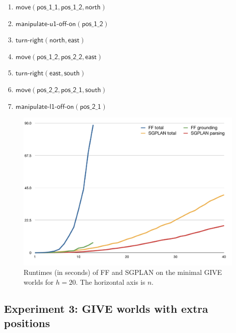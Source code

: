 \begin{enumerate}
\item $\mathsf{move}(\mathsf{pos\_1\_1},\mathsf{pos\_1\_2}, \mathsf{north})$
\item $\mathsf{manipulate}\textsf{-}\mathsf{u1}\textsf{-}\mathsf{off}\textsf{-}\mathsf{on}(\mathsf{pos\_1\_2})$
\item $\mathsf{turn}\textsf{-}\mathsf{right}(\mathsf{north}, \mathsf{east})$
\item $\mathsf{move}(\mathsf{pos\_1\_2}, \mathsf{pos\_2\_2},
  \mathsf{east})$
\item $\mathsf{turn}\textsf{-}\mathsf{right}(\mathsf{east}, \mathsf{south})$
\item $\mathsf{move}(\mathsf{pos\_2\_2}, \mathsf{pos\_2\_1}, \mathsf{south})$
\item $\mathsf{manipulate}\textsf{-}\mathsf{l1}\textsf{-}\mathsf{off}\textsf{-}\mathsf{on}(\mathsf{pos\_2\_1})$
\end{enumerate}




\begin{figure}
  \centering
  \includegraphics[width=1\columnwidth]{pic-runtime-buttons}
  \caption{Runtimes (in seconds) of FF and SGPLAN on the minimal GIVE
    worlds for $h=20$. The horizontal axis is $n$.}
  \label{fig:give-runtime-minimal}
\end{figure}


\subsection{Experiment 3: GIVE worlds with extra positions}
\label{sec:experiment-3:-give}

